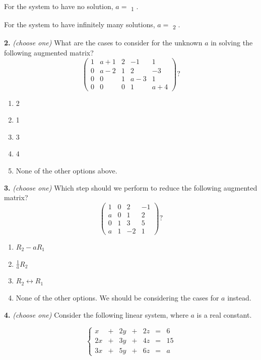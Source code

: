 \documentclass[10pt,a4paper]{article}
\begin{document}
For the system to have no solution, \(a=\) \underline{\hspace{1.2cm}}\textsubscript{1} 
.

For the system to have infinitely many solutions, \(a=\) \underline{\hspace{1.2cm}}\textsubscript{2} 
.

\smallskip
\textbf{2.} \textit{(choose one)} What are the cases to consider for the unknown \(a\) in solving the following augmented matrix? \[\left(\begin{array}{cccc|c} 1&a+1&2&-1&1\\ 0&a-2&1&2&-3\\ 0&0&1&a-3&1\\ 0&0&0&1&a+4 \end{array}\right)?\]

\begin{enumerate}[label=(\Alph*)]
\item 2
\item 1
\item 3
\item 4
\item None of the other options above.
\end{enumerate}
\smallskip
\textbf{3.} \textit{(choose one)} Which step should we perform to reduce the following augmented matrix? \[\left(\begin{array}{ccc|c} 1&0&2&-1\\ a&0&1&2\\ 0&1&3&5\\ a&1&-2&1 \end{array}\right)?\]

\begin{enumerate}[label=(\Alph*)]
\item \(R_2-aR_1\)
\item \(\frac{1}{a}R_2\)
\item \(R_2\leftrightarrow R_1\)
\item None of the other options. We should be considering the cases for \(a\) instead.
\end{enumerate}
\smallskip
\textbf{4.} \textit{(choose one)} Consider the following linear system, where \(a\) is a real constant.

\[\left\{\begin{array}{ccccccc} x&+&2y&+&2z&=&6\\ 2x&+&3y&+&4z&=&15\\ 3x&+&5y&+&6z&=&a \end{array}\right.\]
\end{document}
